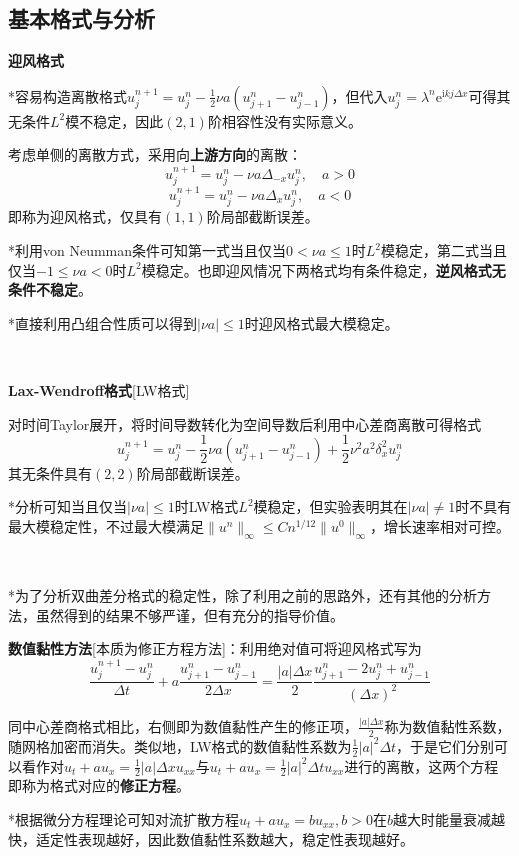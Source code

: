 \documentclass[a4paper,UTF8,fontset=windows]{ctexart}
\begin{document}
\subsection{基本格式与分析}
\textbf{迎风格式}

*容易构造离散格式$u_j^{n+1}=u_j^n-\frac{1}{2}\nu a(u_{j+1}^n-u_{j-1}^n)$，但代入$u_j^n=\lambda^n\mathrm{e}^{\mathrm{i}kj\Delta x}$可得其无条件$L^2$模不稳定，因此$(2,1)$阶相容性没有实际意义。

考虑单侧的离散方式，采用向\textbf{上游方向}的离散：
$$u_j^{n+1}=u_j^n-\nu a\Delta_{-x}u_j^n,\quad a>0$$
$$u_j^{n+1}=u_j^n-\nu a\Delta_xu_j^n,\quad a<0$$
即称为迎风格式，仅具有$(1,1)$阶局部截断误差。

*利用von Neumman条件可知第一式当且仅当$0<\nu a\le1$时$L^2$模稳定，第二式当且仅当$-1\le\nu a<0$时$L^2$模稳定。也即迎风情况下两格式均有条件稳定，\textbf{逆风格式无条件不稳定}。

*直接利用凸组合性质可以得到$|\nu a|\le1$时迎风格式最大模稳定。

\

\textbf{Lax-Wendroff格式}[LW格式]

对时间Taylor展开，将时间导数转化为空间导数后利用中心差商离散可得格式
$$u_j^{n+1}=u_j^n-\frac{1}{2}\nu a(u_{j+1}^n-u_{j-1}^n)+\frac{1}{2}\nu^2a^2\delta_x^2u_j^n$$
其无条件具有$(2,2)$阶局部截断误差。

*分析可知当且仅当$|\nu a|\le1$时LW格式$L^2$模稳定，但实验表明其在$|\nu a|\ne1$时不具有最大模稳定性，不过最大模满足$\|u^n\|_\infty\le Cn^{1/12}\|u^0\|_\infty$，增长速率相对可控。

\

*为了分析双曲差分格式的稳定性，除了利用之前的思路外，还有其他的分析方法，虽然得到的结果不够严谨，但有充分的指导价值。

\textbf{数值黏性方法}[本质为修正方程方法]：利用绝对值可将迎风格式写为
$$\frac{u_j^{n+1}-u_j^n}{\Delta t}+a\frac{u_{j+1}^n-u_{j-1}^n}{2\Delta x}=\frac{|a|\Delta x}{2}\frac{u_{j+1}^n-2u_j^n+u_{j-1}^n}{(\Delta x)^2}$$

同中心差商格式相比，右侧即为数值黏性产生的修正项，$\frac{|a|\Delta x}{2}$称为数值黏性系数，随网格加密而消失。类似地，LW格式的数值黏性系数为$\frac{1}{2}|a|^2\Delta t$，于是它们分别可以看作对$u_t+au_x=\frac{1}{2}|a|\Delta xu_{xx}$与$u_t+au_x=\frac{1}{2}|a|^2\Delta tu_{xx}$进行的离散，这两个方程即称为格式对应的\textbf{修正方程}。

*根据微分方程理论可知对流扩散方程$u_t+au_x=bu_{xx},b>0$在$b$越大时能量衰减越快，适定性表现越好，因此数值黏性系数越大，稳定性表现越好。
\end{document}

